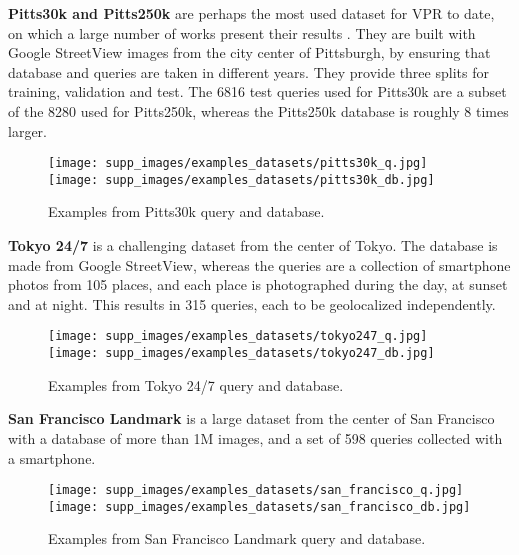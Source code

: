 \documentclass[10pt,twocolumn,letterpaper]{article}
\newcommand{\myparagraph}[1]{\vspace{4pt}\noindent\textbf{#1}}
\begin{document}
\myparagraph{Pitts30k and Pitts250k} \cite{Torii_2015_pitts250k}
are perhaps the most used dataset for VPR to date, on which a large number of works present their results \cite{Arandjelovic_2018_netvlad, Kim_2017_crn, Liu_2019_sare, Ge_2020_sfrs, Alibey_2022_gsvcities, Alibey_2023_mixvpr, Berton_2021_geowarp, Hausler_2021_patch_netvlad, Zhang_2021_gated_netvlad, Berton_2022_cosPlace}.
They are built with Google StreetView images from the city center of Pittsburgh, by ensuring that database and queries are taken in different years.
They provide three splits for training, validation and test.
The 6816 test queries used for Pitts30k are a subset of the 8280 used for Pitts250k, whereas the Pitts250k database is roughly 8 times larger.
\vspace{-0.3cm}
\begin{figure}[H]
    \begin{center}
    \texttt{[image: supp\_images/examples\_datasets/pitts30k\_q.jpg]}
    \texttt{[image: supp\_images/examples\_datasets/pitts30k\_db.jpg]}
    \end{center}
    \vspace{-0.6cm}
    \caption{Examples from Pitts30k query and database.}
\end{figure}
\vspace{-0.3cm}

\myparagraph{Tokyo 24/7} \cite{Torii_2018_tokyo247} is a challenging dataset from the center of Tokyo.
The database is made from Google StreetView, whereas the queries are a collection of smartphone photos from 105 places, and each place is photographed during the day, at sunset and at night. This results in 315 queries, each to be geolocalized independently.
\vspace{-0.3cm}
\begin{figure}[H]
    \begin{center}
    \texttt{[image: supp\_images/examples\_datasets/tokyo247\_q.jpg]}
    \texttt{[image: supp\_images/examples\_datasets/tokyo247\_db.jpg]}
    \end{center}
    \vspace{-0.6cm}
    \caption{Examples from Tokyo 24/7 query and database.}
\end{figure}
\vspace{-0.3cm}

\myparagraph{San Francisco Landmark} \cite{Chen_2011_san_francisco} is a large dataset from the center of San Francisco with a database of more than 1M images, and a set of 598 queries collected with a smartphone.
\vspace{-0.3cm}
\begin{figure}[H]
    \begin{center}
    \texttt{[image: supp\_images/examples\_datasets/san\_francisco\_q.jpg]}
    \texttt{[image: supp\_images/examples\_datasets/san\_francisco\_db.jpg]}
    \end{center}
    \vspace{-0.6cm}
    \caption{Examples from San Francisco Landmark query and database.}
\end{figure}
\vspace{-0.3cm}
\end{document}
